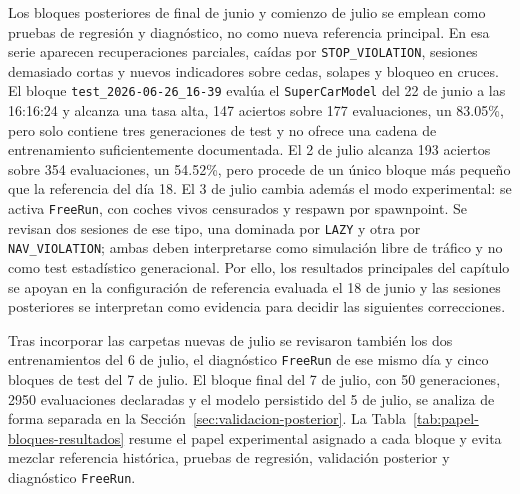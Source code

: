 Los bloques posteriores de final de junio y comienzo de julio se emplean como pruebas de regresión y diagnóstico, no como nueva referencia principal. En esa serie aparecen recuperaciones parciales, caídas por \texttt{STOP\_VIOLATION}, sesiones demasiado cortas y nuevos indicadores sobre cedas, solapes y bloqueo en cruces. El bloque \texttt{test\_2026-06-26\_16-39} evalúa el \texttt{SuperCarModel} del 22 de junio a las 16:16:24 y alcanza una tasa alta, 147 aciertos sobre 177 evaluaciones, un 83.05\%, pero solo contiene tres generaciones de test y no ofrece una cadena de entrenamiento suficientemente documentada. El 2 de julio alcanza 193 aciertos sobre 354 evaluaciones, un 54.52\%, pero procede de un único bloque más pequeño que la referencia del día 18. El 3 de julio cambia además el modo experimental: se activa \texttt{FreeRun}, con coches vivos censurados y respawn por spawnpoint. Se revisan dos sesiones de ese tipo, una dominada por \texttt{LAZY} y otra por \texttt{NAV\_VIOLATION}; ambas deben interpretarse como simulación libre de tráfico y no como test estadístico generacional. Por ello, los resultados principales del capítulo se apoyan en la configuración de referencia evaluada el 18 de junio y las sesiones posteriores se interpretan como evidencia para decidir las siguientes correcciones.

Tras incorporar las carpetas nuevas de julio se revisaron también los dos entrenamientos del 6 de julio, el diagnóstico \texttt{FreeRun} de ese mismo día y cinco bloques de test del 7 de julio. El bloque final del 7 de julio, con 50 generaciones, 2950 evaluaciones declaradas y el modelo persistido del 5 de julio, se analiza de forma separada en la Sección~\ref{sec:validacion-posterior}. La Tabla~\ref{tab:papel-bloques-resultados} resume el papel experimental asignado a cada bloque y evita mezclar referencia histórica, pruebas de regresión, validación posterior y diagnóstico \texttt{FreeRun}.

